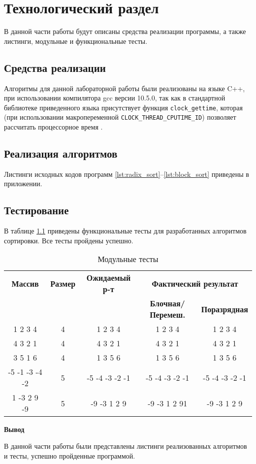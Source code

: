 \chapter{Технологический раздел}

В данной части работы будут описаны средства реализации программы, а также листинги, модульные и функциональные тесты.

\section{Средства реализации}
Алгоритмы для данной лабораторной работы были реализованы на языке C++, при использовании компилятора gcc версии 10.5.0, так как в стандартной библиотеке приведенного языка
присутствует функция \texttt{clock\_gettime}, которая (при использовании макропеременной \texttt{CLOCK\_THREAD\_CPUTIME\_ID}) позволяет рассчитать процессорное время  \cite{cpp-time}.



\section{Реализация алгоритмов}
Листинги исходных кодов программ  \ref{lst:radix_sort}--\ref{lst:block_sort} приведены в приложении.


\section{Тестирование}

В таблице \ref{t:mod_tests} приведены функциональные тесты для разработанных алгоритмов сортировки. Все тесты пройдены успешно.
\begin{table}[ht]
	\small
	\begin{center}
		\begin{threeparttable}
			\caption{Модульные тесты}
			\label{t:mod_tests}
			\begin{tabular}{|c|c|c|c|c|}
				\hline
				\bfseries Массив
				& \bfseries Размер
				& \bfseries Ожидаемый р-т
				& \multicolumn{2}{c|}{\bfseries Фактический результат} \\ \cline{4-5}
				& & & \bfseries Блочная/Перемеш. & \bfseries Поразрядная \\
				\hline
				1 2 3 4  & 4 & 1 2 3 4 & 1 2 3 4 & 1 2 3 4 \\
				\hline
				4 3 2 1 & 4 & 4 3 2 1 & 4 3 2 1 & 4 3 2 1 \\
				\hline
				3 5 1 6 & 4 & 1 3 5 6  & 1 3 5 6 & 1 3 5 6 \\
				\hline
				-5 -1 -3 -4 -2 & 5 & -5 -4 -3 -2 -1 & -5 -4 -3 -2 -1 & -5 -4 -3 -2 -1 \\
				\hline
				1 -3 2 9 -9 & 5 & -9 -3 1 2 9  & -9 -3 1 2 91 & -9 -3 1 2 9 \\
				\hline
			\end{tabular}	
		\end{threeparttable}	
	\end{center}
\end{table}

\textbf{Вывод}

В данной части работы были представлены листинги реализованных алгоритмов и тесты, успешно пройденные программой.